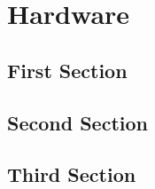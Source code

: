 \chapter{Hardware}
\thispagestyle{fancy}


\blindtext
\blindtext
\blindtext
\blindtext
\blindtext
\blindtext
\blindtext
\blindtext
\blindtext


\section{First Section}
\blindtext
\blindtext
\blindtext
\blindtext
\blindtext
\blindtext
\blindtext
\blindtext

\section{Second Section}
\blindtext
\blindtext
\blindtext
\blindtext
\blindtext
\blindtext
\blindtext

\section{Third Section}
\blindtext
\blindtext
\blindtext
\blindtext
\blindtext
\blindtext
\blindtext
\blindtext
\blindtext